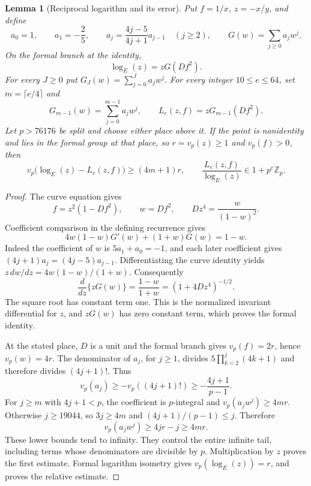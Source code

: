 \documentclass[11pt]{article}
\newtheorem{lemma}[theorem]{Lemma}
\theoremstyle{definition}
\theoremstyle{remark}
\newcommand{\Z}{\mathbb Z}
\begin{document}
\begin{lemma}[Reciprocal logarithm and its error]
\label{lem:quartic-reciprocal-log}
\label{lem:quartic-uniform-reciprocal}
Put $f=1/x$, $z=-x/y$, and define
\[
 a_0=1,\qquad a_1=-\frac25,\qquad
 a_j=\frac{4j-5}{4j+1}a_{j-1}\quad(j\ge2),\qquad
 G(w)=\sum_{j\ge0}a_jw^j.
\]
On the formal branch at the identity,
\[
 \log_E(z)=zG(Df^2).
\]
For every $J\ge0$ put $G_J(w)=\sum_{j=0}^{J}a_jw^j$.
For every integer $10\le e\le64$, set $m=\lceil e/4\rceil$ and
\[
 G_{m-1}(w)=\sum_{j=0}^{m-1}a_jw^j,\qquad
 L_e(z,f)=zG_{m-1}(Df^2).
\]
Let $p>76176$ be split and choose either place above it. If the point is
nonidentity and lies in the formal group at that place, so
$r=v_p(z)\ge1$ and $v_p(f)>0$, then
\[
 v_p\bigl(\log_E(z)-L_e(z,f)\bigr)\ge(4m+1)r,
 \qquad \frac{L_e(z,f)}{\log_E(z)}\in1+p^e\Z_p.
\]
\end{lemma}
\begin{proof}
The curve equation gives
\[
 f=z^2(1-Df^2),\qquad w=Df^2,\qquad Dz^4=\frac{w}{(1-w)^2}.
\]
Coefficient comparison in the defining recurrence gives
\[
 4w(1-w)G'(w)+(1+w)G(w)=1-w.
\]
Indeed the coefficient of $w$ is $5a_1+a_0=-1$, and each later
coefficient gives $(4j+1)a_j=(4j-5)a_{j-1}$. Differentiating the
curve identity yields $z\,dw/dz=4w(1-w)/(1+w)$. Consequently
\[
 \frac{d}{dz}\{zG(w)\}=\frac{1-w}{1+w}
                   =(1+4Dz^4)^{-1/2}.
\]
The square root has constant term one. This is the normalized invariant
differential for $z$, and $zG(w)$ has zero constant term, which proves
the formal identity.

At the stated place, $D$ is a unit and the formal branch gives
$v_p(f)=2r$, hence $v_p(w)=4r$. The denominator of $a_j$, for $j\ge1$,
divides $5\prod_{k=2}^j(4k+1)$ and therefore divides $(4j+1)!$.
Thus
\[
 v_p(a_j)\ge-v_p((4j+1)!)\ge-\frac{4j+1}{p-1}.
\]
For $j\ge m$ with $4j+1<p$, the coefficient is $p$-integral and
$v_p(a_jw^j)\ge4mr$. Otherwise $j\ge19044$, so $3j\ge4m$ and
$(4j+1)/(p-1)\le j$. Therefore
\[
 v_p(a_jw^j)\ge4jr-j\ge4mr.
\]
These lower bounds tend to infinity. They control the entire infinite
tail, including terms whose denominators are divisible by $p$.
Multiplication by $z$ proves the first estimate. Formal logarithm isometry
gives $v_p(\log_E(z))=r$, and proves the relative estimate.
\end{proof}
\end{document}
